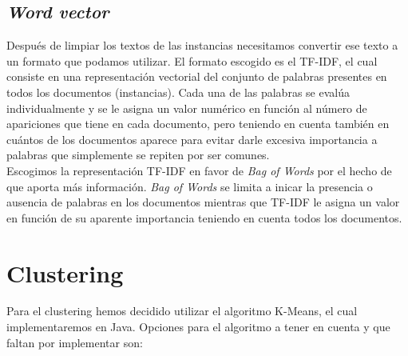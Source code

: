 \documentclass[10pt,a4paper,draft]{article}
\begin{document}
\subsection{\textit{Word vector}}
Después de limpiar los textos de las instancias necesitamos convertir ese texto a un formato que podamos utilizar. El formato escogido es el TF-IDF, el cual consiste en una representación vectorial del conjunto de palabras presentes en todos los documentos (instancias). Cada una de las palabras se evalúa individualmente y se le asigna un valor numérico en función al número de apariciones que tiene en cada documento, pero teniendo en cuenta también en cuántos de los documentos aparece para evitar darle excesiva importancia a palabras que simplemente se repiten por ser comunes.\\

Escogimos la representación TF-IDF en favor de \textit{Bag of Words} por el hecho de que aporta más información. \textit{Bag of Words} se limita a inicar la presencia o ausencia de palabras en los documentos mientras que TF-IDF le asigna un valor en función de su aparente importancia teniendo en cuenta todos los documentos.

\section{Clustering}
Para el clustering hemos decidido utilizar el algoritmo K-Means, el cual implementaremos en Java. Opciones para el algoritmo a tener en cuenta y que faltan por implementar son:
\end{document}
